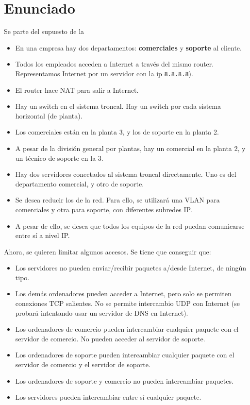 \section{Enunciado}
Se parte del supuesto de la 
\begin{itemize}
\item En una empresa hay dos departamentos: \textbf{comerciales} y \textbf{soporte} al cliente.
\item Todos los empleados acceden a Internet a través del mismo router. Representamos Internet por un servidor con la ip \texttt{8.8.8.8}).
\item El router hace NAT para salir a Internet.
\item Hay un switch en el sistema troncal. Hay un switch por cada sistema horizontal (de planta).  
\item Los comerciales están en la planta 3, y los de soporte en la planta 2.
\item A pesar de la división general por plantas, hay un comercial en la planta 2, y un técnico de soporte en la 3.
\item Hay dos servidores conectados al sistema troncal directamente. Uno es del departamento comercial, y otro de soporte.
\item Se desea reducir los  de la red. Para ello, se utilizará una VLAN para comerciales y otra para soporte, con diferentes subredes IP.
\item A pesar de ello, se desea que todos los equipos de la red puedan comunicarse entre sí a nivel IP.
\end{itemize}

Ahora, se quieren limitar algunos accesos. Se tiene que conseguir que:
\begin{itemize}
\item Los servidores no pueden enviar/recibir paquetes a/desde Internet, de ningún tipo.
\item Los demás ordenadores pueden acceder a Internet, pero solo se permiten conexiones TCP salientes. No se permite intercambio UDP con Internet (se probará intentando usar un servidor de DNS en Internet).
\item Los ordenadores de comercio pueden intercambiar cualquier paquete con el servidor de comercio. No pueden acceder al servidor de soporte.
\item Los ordenadores de soporte pueden intercambiar cualquier paquete con el servidor de comercio y el servidor de soporte.
\item Los ordenadores de soporte y comercio no pueden intercambiar paquetes.
\item Los servidores pueden intercambiar entre sí cualquier paquete.
\end{itemize}


